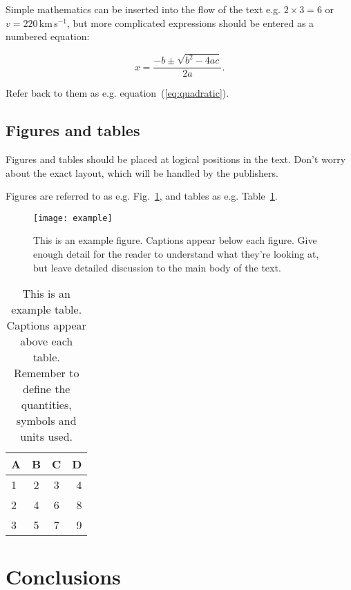 \documentclass[a4paper,fleqn,usenatbib]{mnras}
\begin{document}
Simple mathematics can be inserted into the flow of the text e.g. $2\times3=6$
or $v=220$\,km\,s$^{-1}$, but more complicated expressions should be entered
as a numbered equation:

\begin{equation}
    x=\frac{-b\pm\sqrt{b^2-4ac}}{2a}.
	\label{eq:quadratic}
\end{equation}

Refer back to them as e.g. equation~(\ref{eq:quadratic}).

\subsection{Figures and tables}

Figures and tables should be placed at logical positions in the text. Don't
worry about the exact layout, which will be handled by the publishers.

Figures are referred to as e.g. Fig.~\ref{fig:example_figure}, and tables as
e.g. Table~\ref{tab:example_table}.

\begin{figure}
	\texttt{[image: example]}
    \caption{This is an example figure. Captions appear below each figure.
	Give enough detail for the reader to understand what they're looking at,
	but leave detailed discussion to the main body of the text.}
    \label{fig:example_figure}
\end{figure}

\begin{table}
	\centering
	\caption{This is an example table. Captions appear above each table.
	Remember to define the quantities, symbols and units used.}
	\label{tab:example_table}
	\begin{tabular}{lccr} %
		\hline
		A & B & C & D\\
		\hline
		1 & 2 & 3 & 4\\
		2 & 4 & 6 & 8\\
		3 & 5 & 7 & 9\\
		\hline
	\end{tabular}
\end{table}


\section{Conclusions}
\end{document}
